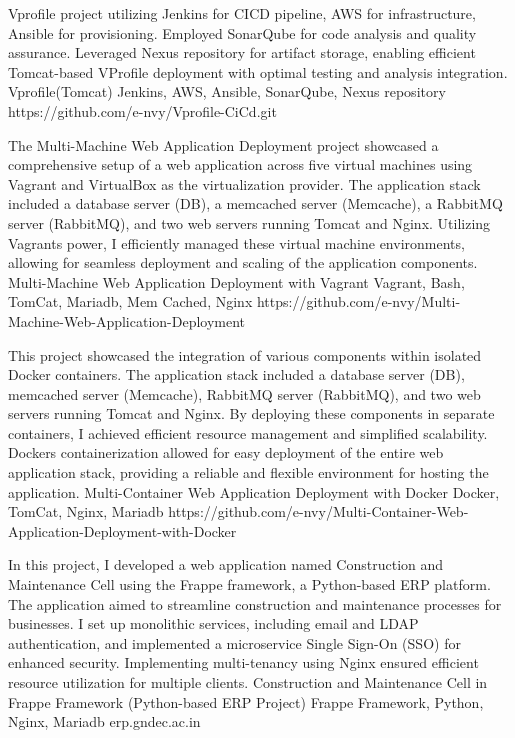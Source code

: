 \documentclass[]{awesome-cv}
\begin{document}
\vspace{-7mm}
\begin{cventries}
	\cventry
	{Vprofile project utilizing Jenkins for CICD pipeline, AWS for infrastructure, Ansible for provisioning. Employed SonarQube for code analysis and quality assurance. Leveraged Nexus repository for artifact storage, enabling efficient Tomcat-based VProfile deployment with optimal testing and analysis integration.}
	{Vprofile(Tomcat)}
	{Jenkins, AWS, Ansible, SonarQube, Nexus repository}
	{https://github.com/e-nvy/Vprofile-CiCd.git}
	{}
	
	\vspace{-5mm}
	\cventry
	{The Multi-Machine Web Application Deployment project showcased a comprehensive setup of a web application across five virtual machines using Vagrant and VirtualBox as the virtualization provider. The application stack included a database server (DB), a memcached server (Memcache), a RabbitMQ server (RabbitMQ), and two web servers running Tomcat and Nginx. Utilizing Vagrant\textquotesingle{}s power, I efficiently managed these virtual machine environments, allowing for seamless deployment and scaling of the application components.}
	{Multi-Machine Web Application Deployment with Vagrant}
	{Vagrant, Bash, TomCat, Mariadb, Mem Cached, Nginx}
	{https://github.com/e-nvy/Multi-Machine-Web-Application-Deployment}
	{}
	
	\vspace{-5mm}
	\cventry
	{This project showcased the integration of various components within isolated Docker containers. The application stack included a database server (DB), memcached server (Memcache), RabbitMQ server (RabbitMQ), and two web servers running Tomcat and Nginx. By deploying these components in separate containers, I achieved efficient resource management and simplified scalability. Docker\textquotesingle{}s containerization allowed for easy deployment of the entire web application stack, providing a reliable and flexible environment for hosting the application.}
	{Multi-Container Web Application Deployment with Docker}
	{Docker, TomCat, Nginx, Mariadb}
	{https://github.com/e-nvy/Multi-Container-Web-Application-Deployment-with-Docker}
	{}
	
	\vspace{-5mm}
	\cventry
	{In this project, I developed a web application named \textquotedbl{}Construction and Maintenance Cell\textquotedbl{} using the Frappe framework, a Python-based ERP platform. The application aimed to streamline construction and maintenance processes for businesses. I set up monolithic services, including email and LDAP authentication, and implemented a microservice Single Sign-On (SSO) for enhanced security. Implementing multi-tenancy using Nginx ensured efficient resource utilization for multiple clients.}
	{Construction and Maintenance Cell in Frappe Framework (Python-based ERP Project)}
	{Frappe Framework, Python, Nginx, Mariadb}
	{erp.gndec.ac.in}
	{}
	

\end{cventries}
\end{document}

